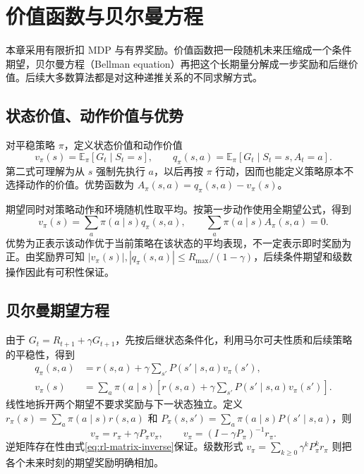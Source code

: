 \setcounter{chapter}{4} %
\chapter{价值函数与贝尔曼方程}
\label{ch:rl-bellman}

本章采用有限折扣 MDP 与有界奖励。价值函数把一段随机未来压缩成一个条件期望，贝尔曼方程（Bellman equation）再把这个长期量分解成一步奖励和后继价值。后续大多数算法都是对这种递推关系的不同求解方式。

\section{状态价值、动作价值与优势}

\begin{definition}[价值与优势]
对平稳策略 $\pi$，定义状态价值和动作价值
\[
v_\pi(s)=\mathbb E_\pi[G_t\mid S_t=s],\qquad
q_\pi(s,a)=\mathbb E_\pi[G_t\mid S_t=s,A_t=a].
\]
第二式可理解为从 $s$ 强制先执行 $a$，以后再按 $\pi$ 行动，因而也能定义策略原本不选择动作的价值。优势函数为 $A_\pi(s,a)=q_\pi(s,a)-v_\pi(s)$。
\end{definition}

期望同时对策略动作和环境随机性取平均。按第一步动作使用全期望公式，得到
\begin{equation}
v_\pi(s)=\sum_a\pi(a\mid s)q_\pi(s,a),\qquad
\sum_a\pi(a\mid s)A_\pi(s,a)=0.
\label{eq:rl-value-advantage}
\end{equation}
优势为正表示该动作优于当前策略在该状态的平均表现，不一定表示即时奖励为正。由奖励界可知 $|v_\pi(s)|,|q_\pi(s,a)|\leq R_{\max}/(1-\gamma)$，后续条件期望和级数操作因此有可积性保证。

\section{贝尔曼期望方程}

由于 $G_t=R_{t+1}+\gamma G_{t+1}$，先按后继状态条件化，利用马尔可夫性质和后续策略的平稳性，得到
\begin{align}
q_\pi(s,a)&=r(s,a)+\gamma\sum_{s'}P(s'\mid s,a)v_\pi(s'),\label{eq:rl-bellman-q}\\
v_\pi(s)&=\sum_a\pi(a\mid s)\left[r(s,a)+\gamma\sum_{s'}P(s'\mid s,a)v_\pi(s')\right].\label{eq:rl-bellman-v}
\end{align}
线性地拆开两个期望不要求奖励与下一状态独立。定义 $r_\pi(s)=\sum_a\pi(a\mid s)r(s,a)$ 和 $P_\pi(s,s')=\sum_a\pi(a\mid s)P(s'\mid s,a)$，则
\[
v_\pi=r_\pi+\gamma P_\pi v_\pi,
\qquad v_\pi=(I-\gamma P_\pi)^{-1}r_\pi.
\]
逆矩阵存在性由式\eqref{eq:rl-matrix-inverse}保证。级数形式 $v_\pi=\sum_{k\geq0}\gamma^kP_\pi^kr_\pi$ 则把各个未来时刻的期望奖励明确相加。

